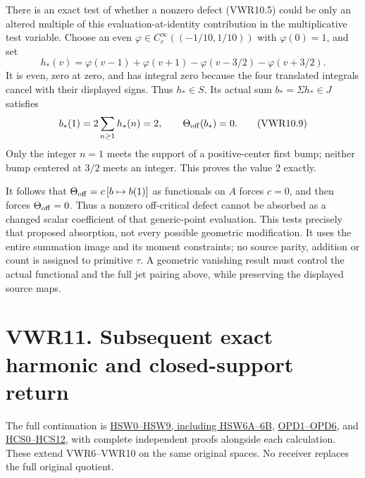 There is an exact test of whether a nonzero defect (VWR10.5) could be
only an altered multiple of this evaluation-at-identity contribution in
the multiplicative test variable. Choose an even
\(\varphi\in C_c^\infty((-1/10,1/10))\) with \(\varphi(0)=1\), and set
\[
h_*(v)=\varphi(v-1)+\varphi(v+1)
 -\varphi(v-3/2)-\varphi(v+3/2).
\tag{VWR10.8}
\] It is even, zero at zero, and has integral zero because the four
translated integrals cancel with their displayed signs. Thus
\(h_*\in S\). Its actual sum \(b_* =\Sigma h_*\in J\) satisfies \[
b_*(1)=2\sum_{n\ge1}h_*(n)=2,
\qquad \Theta_{\rm off}(b_*)=0.
\tag{VWR10.9}
\] Only the integer \(n=1\) meets the support of a positive-center first
bump; neither bump centered at \(3/2\) meets an integer. This proves the
value 2 exactly.

It follows that \(\Theta_{\rm off}=c\,[b\mapsto b(1)]\) as functionals
on \(A\) forces \(c=0\), and then forces \(\Theta_{\rm off}=0\). Thus a
nonzero off-critical defect cannot be absorbed as a changed scalar
coefficient of that generic-point evaluation. This tests precisely that
proposed absorption, not every possible geometric modification. It uses
the entire summation image and its moment constraints; no source parity,
addition or count is assigned to primitive \(\tau\). A geometric
vanishing result must control the actual functional and the full jet
pairing above, while preserving the displayed source maps.

\section{VWR11. Subsequent exact harmonic and closed-support
return}\label{vwr11.-subsequent-exact-harmonic-and-closed-support-return}

The full continuation is
\href{https://github.com/KokunoYumeto/zeta-function-research-reader/blob/main/workbenches/splitzero-tandem/continuations/20260925-full-source-tensor-and-original-divisor/counterfactual/ORIGINAL_ZETA_HARMONIC_SWEEP_AND_OFFCRITICAL_DEFECT.md}{HSW0--HSW9,
including HSW6A--6B},
\href{https://github.com/KokunoYumeto/zeta-function-research-reader/blob/main/workbenches/splitzero-tandem/continuations/20260925-full-source-tensor-and-original-divisor/counterfactual/ORIGINAL_PRIME_DILATION_FORCING_IDENTITY.md}{OPD1--OPD6},
and
\href{https://github.com/KokunoYumeto/zeta-function-research-reader/blob/main/workbenches/splitzero-tandem/continuations/20260925-full-source-tensor-and-original-divisor/counterfactual/HILBERT_CLOSURE_CLOSED_SUPPORT_AND_RESTRICTION.md}{HCS0--HCS12},
with complete independent proofs alongside each calculation. These
extend VWR6--VWR10 on the same original spaces. No receiver replaces the
full original quotient.

